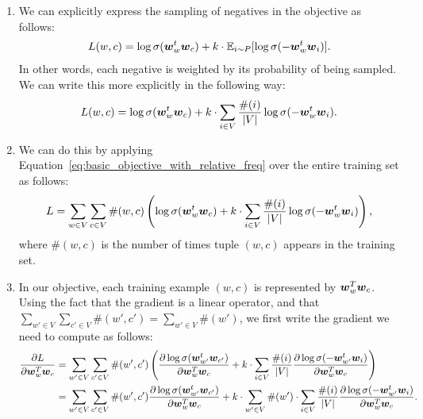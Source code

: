 \documentclass[11pt,a4paper]{article}
\begin{document}
\begin{enumerate}[label=(\alph*)]
    \item We can explicitly express the sampling of negatives in the objective
          as follows:
          \begin{align}\label{eq:basic_objective_with_expectation}
              L(w,c) = \log \sigma({\boldsymbol{w}}_w^t{\boldsymbol{w}}_c) + k\cdot \mathbb{E}_{i\sim P}[\log \sigma(-{\boldsymbol{w}}_w^t{\boldsymbol{w}}_i)].
          \end{align}
          In other words, each negative is weighted by its probability of being
          sampled.
          We can write this more explicitly in the following way:
          \begin{align}\label{eq:basic_objective_with_relative_freq}
              L(w,c) = \log \sigma({\boldsymbol{w}}_w^t{\boldsymbol{w}}_c) + k\cdot \sum_{i\in V} \frac{\#(i)}{|V|}\log \sigma(-{\boldsymbol{w}}_w^t{\boldsymbol{w}}_i).
          \end{align}
    \item We can do this by applying
          Equation~\ref{eq:basic_objective_with_relative_freq} over the entire
          training set as follows:
          \begin{align}\label{eq:general_objective_with_relative_freq}
              L = \sum_{w\in V} \sum_{c\in V} \#(w,c)\left(\log \sigma({\boldsymbol{w}}_w^t{\boldsymbol{w}}_c) + k\cdot \sum_{i\in V} \frac{\#(i)}{|V|}\log \sigma(-{\boldsymbol{w}}_w^t{\boldsymbol{w}}_i)\right),
          \end{align}
          where $\#(w,c)$ is the number of times tuple $(w,c)$ appears in the
          training set.
    \item In our objective, each training example $(w,c)$ is represented by
          ${\boldsymbol{w}}_w^T{\boldsymbol{w}}_c$.
          Using the fact that the gradient is a linear operator, and that
          $\sum_{w'\in V} \sum_{c'\in V} \#(w',c') = \sum_{w'\in V}\#(w')$,
          we first write the gradient we need to compute as follows:
          \begin{align*}
              \frac{\partial L}{\partial \vw_w^T\vw_c} & = \sum_{w'\in V} \sum_{c'\in V} \#(w',c')\left(\frac{\partial \log \sigma(\vw_{w'}^t\vw_{c'})}{\partial \vw_w^T\vw_c} + k\cdot \sum_{i\in V} \frac{\#(i)}{|V|}\frac{\partial \log\sigma(-\vw_{w'}^t\vw_i)}{\partial \vw_w^T\vw_c}\right)              \\
                                                       & = \sum_{w'\in V} \sum_{c'\in V} \#(w',c')\frac{\partial \log \sigma(\vw_{w'}^t\vw_{c'})}{\partial \vw_w^T\vw_c} + k\cdot\sum_{w'\in V} \#(w')\cdot\sum_{i\in V} \frac{\#(i)}{|V|}\frac{\partial \log\sigma(-\vw_{w'}^t\vw_i)}{\partial \vw_w^T\vw_c}.

\end{align*}
\end{enumerate}
\end{document}

